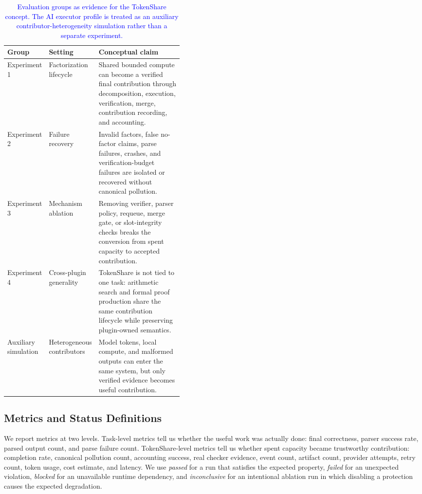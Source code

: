 \documentclass{article}
\theoremstyle{plain}
\begin{document}
\begin{table}[!htbp]
\centering
\caption{\textcolor{blue}{Evaluation groups as evidence for the TokenShare concept. The AI executor profile is treated as an auxiliary contributor-heterogeneity simulation rather than a separate experiment.}}
\label{tab:evaluation-groups}
\small
{\color{blue}
\begin{tabularx}{\linewidth}{p{0.17\linewidth}p{0.25\linewidth}X}
\toprule
Group & Setting & Conceptual claim \\
\midrule
Experiment 1 & Factorization lifecycle
& Shared bounded compute can become a verified final contribution through decomposition, execution, verification, merge, contribution recording, and accounting. \\
Experiment 2 & Failure recovery
& Invalid factors, false no-factor claims, parse failures, crashes, and
verification-budget failures are isolated or recovered without canonical
pollution. \\
Experiment 3 & Mechanism ablation
& Removing verifier, parser policy, requeue, merge gate, or slot-integrity checks breaks the conversion from spent capacity to accepted contribution. \\
Experiment 4 & Cross-plugin generality
& TokenShare is not tied to one task: arithmetic search and formal proof production share the same contribution lifecycle while preserving plugin-owned semantics. \\
Auxiliary simulation & Heterogeneous contributors
& Model tokens, local compute, and malformed outputs can enter the same system, but only verified evidence becomes useful contribution. \\
\bottomrule
\end{tabularx}
}
\end{table}

\subsection{Metrics and Status Definitions}
\label{subsec:metrics-status}

{\color{blue}
We report metrics at two levels. Task-level metrics tell us whether the useful work was actually done: final correctness, parser success rate, parsed output count, and parse failure count. TokenShare-level metrics tell us whether spent capacity became trustworthy contribution: completion rate, canonical pollution count, accounting success, real checker evidence, event count, artifact count, provider attempts, retry count, token usage, cost estimate, and latency. We use \emph{passed} for a run that satisfies the expected property, \emph{failed} for an unexpected violation, \emph{blocked} for an unavailable runtime dependency, and \emph{inconclusive} for an intentional ablation run in which disabling a protection causes the expected degradation.
}
\end{document}
